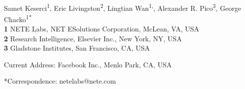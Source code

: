 \documentclass[10pt,letterpaper]{article}
\date{}
\begin{document}
\vspace*{0.2in}

\begin{flushleft}
{\Large
\textbf{} %
}
\newline
\\
Samet Keserci\textsuperscript{1},
Eric Livingston\textsuperscript{2},
Lingtian Wan\textsuperscript{1,\textcurrency},
Alexander R. Pico\textsuperscript{3},
 George Chacko\textsuperscript{1*}
\\
\bigskip
\textbf{1} NETE Labs, NET ESolutions Corporation, McLean, VA, USA
\\
\textbf{2} Research Intelligence, Elsevier Inc., New York, NY, USA
\\
\textbf{3} Gladstone Institutes, San Francisco, CA, USA
\\
\bigskip


% 
%


\textcurrency Current Address: Facebook Inc., Menlo Park, CA, USA %



*Correspondence: netelabs@nete.com
\end{flushleft}
\end{document}
